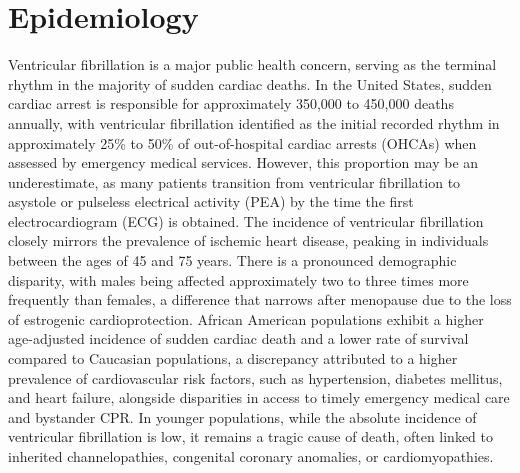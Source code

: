 \section*{Epidemiology}
Ventricular fibrillation is a major public health concern, serving as the terminal rhythm in the majority of sudden cardiac deaths. In the United States, sudden cardiac arrest is responsible for approximately 350,000 to 450,000 deaths annually, with ventricular fibrillation identified as the initial recorded rhythm in approximately 25\% to 50\% of out-of-hospital cardiac arrests (OHCAs) when assessed by emergency medical services. However, this proportion may be an underestimate, as many patients transition from ventricular fibrillation to asystole or pulseless electrical activity (PEA) by the time the first electrocardiogram (ECG) is obtained.
The incidence of ventricular fibrillation closely mirrors the prevalence of ischemic heart disease, peaking in individuals between the ages of 45 and 75 years. There is a pronounced demographic disparity, with males being affected approximately two to three times more frequently than females, a difference that narrows after menopause due to the loss of estrogenic cardioprotection. African American populations exhibit a higher age-adjusted incidence of sudden cardiac death and a lower rate of survival compared to Caucasian populations, a discrepancy attributed to a higher prevalence of cardiovascular risk factors, such as hypertension, diabetes mellitus, and heart failure, alongside disparities in access to timely emergency medical care and bystander CPR. In younger populations, while the absolute incidence of ventricular fibrillation is low, it remains a tragic cause of death, often linked to inherited channelopathies, congenital coronary anomalies, or cardiomyopathies.

